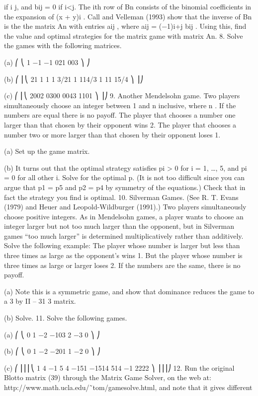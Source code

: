 \documentclass[]{report}
\begin{document}
if i \geq j, and bij = 0 if i<j.
The ith row of Bn consists of the binomial coefficients in the expansion of (x + y)i
. Call
and Velleman (1993) show that the inverse of Bn is the the matrix An with entries aij ,
where aij = (−1)i+j bij . Using this, find the value and optimal strategies for the matrix
game with matrix An.
8. Solve the games with the following matrices.
\item[(a)]
⎛
⎝
1 −1 −1
021
003
⎞
⎠ \item[(b)]
⎛
⎜⎝
21 1 1
1 3/21 1
114/3 1
11 15/4
⎞
⎟⎠
\item[(c)]
⎛
⎜⎝
2002
0300
0043
1101
⎞
⎟⎠
9. Another Mendelsohn game. Two players simultaneously choose an integer
between 1 and n inclusive, where n . If the numbers are equal there is no payoff. The
player that chooses a number one larger than that chosen by their opponent wins 2. The
player that chooses a number two or more larger than that chosen by their opponent loses
1.
\item[(a)] Set up the game matrix.
\item[(b)] It turns out that the optimal strategy satisfies pi > 0 for i = 1, \ldots, 5, and pi = 0 for all
other i. Solve for the optimal p. (It is not too difficult since you can argue that p1 = p5
and p2 = p4 by symmetry of the equations.) Check that in fact the strategy you find is
optimal.
10. Silverman Games. (See R. T. Evans (1979) and Heuer and Leopold-Wildburger
(1991).) Two players simultaneously choose positive integers. As in Mendelsohn games, a
player wants to choose an integer larger but not too much larger than the opponent, but in
Silverman games “too much larger” is determined multiplicatively rather than additively.
Solve the following example: The player whose number is larger but less than three times
as large as the opponent’s wins 1. But the player whose number is three times as large or
larger loses 2. If the numbers are the same, there is no payoff.
\item[(a)] Note this is a symmetric game, and show that dominance reduces the game to a 3 by
II – 31
3 matrix.
\item[(b)] Solve.
11. Solve the following games.
\item[(a)]
⎛
⎝
0 1 −2
−103
2 −3 0
⎞
⎠ \item[(b)]
⎛
⎝
0 1 −2
−201
1 −2 0
⎞
⎠
\item[(c)]
⎛
⎜⎜⎜⎝
1 4 −1 5
4 −151
−1514
514 −1
2222
⎞
⎟⎟⎟⎠
12. Run the original Blotto matrix (39) through the Matrix Game Solver, on the
web at: http://www.math.ucla.edu/˜tom/gamesolve.html, and note that it gives different
\end{document}
